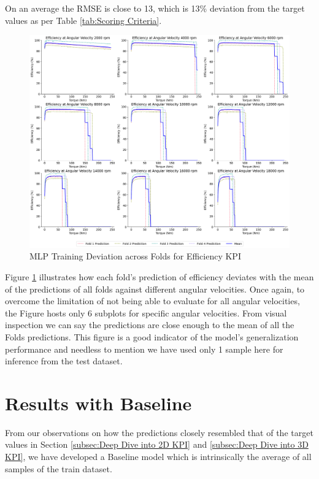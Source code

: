 \documentclass{report} %
\begin{document}
On an average the \ac{RMSE} is close to 13, which is 13\% deviation from the target values as per Table \ref{tab:Scoring Criteria}.

\begin{figure}[H]
    \centering
    \includegraphics[width=1\textwidth]{./ReportImages/folds_dev_y2.png} 
    \caption{MLP Training Deviation across Folds for Efficiency \ac{KPI}} 
    \label{fig:MLP Training Deviation across Folds for Efficiency KPI}
\end{figure}

Figure \ref{fig:MLP Training Deviation across Folds for Efficiency KPI} illustrates how each fold's prediction of efficiency deviates with the mean of the predictions 
of all folds against different angular velocities. Once again, to overcome the limitation of not being able to evaluate for all angular velocities, the Figure hosts only 6 
subplots for specific angular velocities. From visual inspection we can say the predictions are close enough to the mean of all the Folds predictions.
This figure is a good indicator of the model's generalization performance and needless to mention we have used only 1 sample here for inference from the test dataset.

\section{Results with Baseline}\label{sec:Results with Baseline}

From our observations on how the predictions closely resembled that of the target values in Section \ref{subsec:Deep Dive into 2D KPI} and 
\ref{subsec:Deep Dive into 3D KPI}, we have developed a Baseline model which is intrinsically the average of all samples of the train dataset.
\end{document}
